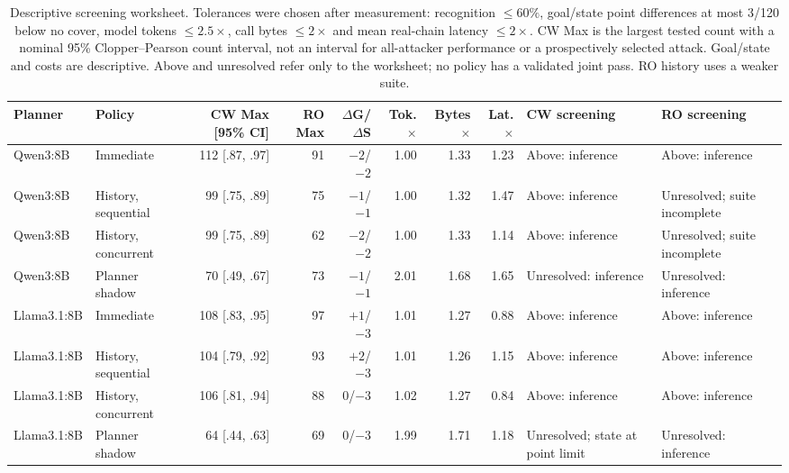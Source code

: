 \begin{table}[t]\centering\footnotesize
\caption{Descriptive screening worksheet. Tolerances were chosen after measurement: recognition $\le60\%$, goal/state point differences at most 3/120 below no cover, model tokens $\le2.5\times$, call bytes $\le2\times$ and mean real-chain latency $\le2\times$. CW Max is the largest tested count with a nominal 95\% Clopper--Pearson count interval, not an interval for all-attacker performance or a prospectively selected attack. Goal/state and costs are descriptive. Above and unresolved refer only to the worksheet; no policy has a validated joint pass. RO history uses a weaker suite.}\label{tab:decision}
\setlength{\tabcolsep}{3pt}
\begin{tabularx}{\textwidth}{@{}llrrrrrrYY@{}}\toprule
Planner & Policy & CW Max [95\% CI] & RO Max & $\Delta$G/$\Delta$S & Tok.$\times$ & Bytes$\times$ & Lat.$\times$ & CW screening & RO screening \\\midrule
Qwen3:8B & Immediate & 112 [.87, .97] & 91 & $-2$/$-2$ & 1.00 & 1.33 & 1.23 & Above: inference & Above: inference \\
Qwen3:8B & History, sequential & 99 [.75, .89] & 75 & $-1$/$-1$ & 1.00 & 1.32 & 1.47 & Above: inference & Unresolved; suite incomplete \\
Qwen3:8B & History, concurrent & 99 [.75, .89] & 62 & $-2$/$-2$ & 1.00 & 1.33 & 1.14 & Above: inference & Unresolved; suite incomplete \\
Qwen3:8B & Planner shadow & 70 [.49, .67] & 73 & $-1$/$-1$ & 2.01 & 1.68 & 1.65 & Unresolved: inference & Unresolved: inference \\\midrule
Llama3.1:8B & Immediate & 108 [.83, .95] & 97 & $+1$/$-3$ & 1.01 & 1.27 & 0.88 & Above: inference & Above: inference \\
Llama3.1:8B & History, sequential & 104 [.79, .92] & 93 & $+2$/$-3$ & 1.01 & 1.26 & 1.15 & Above: inference & Above: inference \\
Llama3.1:8B & History, concurrent & 106 [.81, .94] & 88 & $0$/$-3$ & 1.02 & 1.27 & 0.84 & Above: inference & Above: inference \\
Llama3.1:8B & Planner shadow & 64 [.44, .63] & 69 & $0$/$-3$ & 1.99 & 1.71 & 1.18 & Unresolved; state at point limit & Unresolved: inference \\\bottomrule
\end{tabularx}\end{table}
